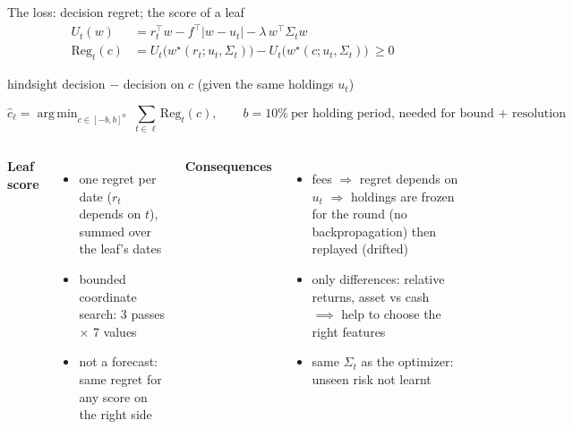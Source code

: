 \documentclass[10pt,aspectratio=169]{beamer}
\newcommand{\1}{\mathbf{1}}
\newcommand{\Reg}{\mathrm{Reg}}
\DeclareMathOperator*{\argmin}{arg\,min}
\begin{document}
\begin{frame}{The loss: decision regret; the score of a leaf}
\begin{align*}
U_t(w)&=r_t^\top w-f^\top|w-u_t|-\lambda\,w^\top\Sigma_t w\\
\Reg_t(c)&=U_t\big(w^\star(r_t;u_t,\Sigma_t)\big)-U_t\big(w^\star(c;u_t,\Sigma_t)\big)\ \ge0
\end{align*}
\centerline{\small hindsight decision $-$ decision on $c$ (given the same holdings $u_t$)}
\[
\hat c_\ell=\argmin_{c\in[-b,b]^n}\ \sum_{t\in\ell}\Reg_t(c),\qquad b=10\%\ \text{per holding period, needed for bound + resolution}
\]
\begin{columns}[T]
\textbf{Leaf score}
\begin{itemize}
\item one regret per date ($r_t$ depends on $t$), summed over the leaf's dates
\item bounded coordinate search: 3 passes $\times$ 7 values
\item not a forecast: same regret for any score on the right side
\end{itemize}
\textbf{Consequences}
\begin{itemize}
\item fees $\Rightarrow$ regret depends on $u_t$ $\Rightarrow$ holdings are frozen for the round (no backpropagation) then replayed (drifted) 
\item only differences: relative returns, asset vs cash $\implies$ help to choose the right features
\item same $\Sigma_t$ as the optimizer: unseen risk not learnt
\end{itemize}
\end{columns}
\end{frame}
\end{document}
